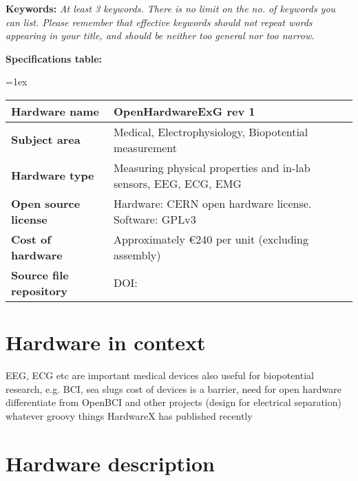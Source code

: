 \documentclass[11pt, letterpaper]{article}
\begin{document}
\begin{flushleft}
\textbf{Keywords:} \textit{At least 3 keywords. There is no limit on the no. of keywords you can list. Please remember that effective keywords should not repeat words appearing in your title, and should be neither too general nor too narrow.}

\newpage
\textbf{Specifications table:}

\tabulinesep=1ex
\begin{tabu} to \linewidth {|X|X[3,l]|}
\hline  \textbf{Hardware name} & OpenHardwareExG rev 1 \\
  \hline \textbf{Subject area} & Medical, Electrophysiology, Biopotential measurement\\
  \hline \textbf{Hardware type} & Measuring physical properties and in-lab sensors, EEG, ECG, EMG \\
\hline \textbf{Open source license} &
 Hardware: CERN open hardware license.\cite{CERNOHL} Software: GPLv3\cite{GPLv3} \\
\hline \textbf{Cost of hardware} & Approximately €240 per unit (excluding assembly) \\
\hline \textbf{Source file repository} &
  DOI: 
\linebreak
\\\hline
\end{tabu}
\end{flushleft}

\section{Hardware in context}
EEG, ECG etc are important medical devices
also useful for biopotential research, e.g. BCI, sea slugs
cost of devices is a barrier, need for open hardware
differentiate from OpenBCI and other projects (design for electrical separation)
whatever groovy things HardwareX has published recently

\section{Hardware description}
\end{document}
